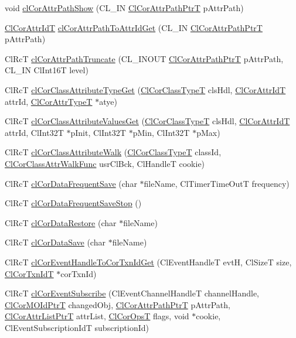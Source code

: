 \begin{CompactItemize}
\item 
void \hyperlink{group__group13_ga137}{cl\-Cor\-Attr\-Path\-Show} (CL\_\-IN \hyperlink{struct_cl_cor_attr_path}{Cl\-Cor\-Attr\-Path\-Ptr\-T} p\-Attr\-Path)
\item 
\hyperlink{group__group13_ga3}{Cl\-Cor\-Attr\-Id\-T} \hyperlink{group__group13_ga138}{cl\-Cor\-Attr\-Path\-To\-Attr\-Id\-Get} (CL\_\-IN \hyperlink{struct_cl_cor_attr_path}{Cl\-Cor\-Attr\-Path\-Ptr\-T} p\-Attr\-Path)
\item 
Cl\-Rc\-T \hyperlink{group__group13_ga133}{cl\-Cor\-Attr\-Path\-Truncate} (CL\_\-INOUT \hyperlink{struct_cl_cor_attr_path}{Cl\-Cor\-Attr\-Path\-Ptr\-T} p\-Attr\-Path, CL\_\-IN Cl\-Int16T level)
\item 
Cl\-Rc\-T \hyperlink{group__group13_ga93}{cl\-Cor\-Class\-Attribute\-Type\-Get} (\hyperlink{group__group13_ga2}{Cl\-Cor\-Class\-Type\-T} cls\-Hdl, \hyperlink{group__group13_ga3}{Cl\-Cor\-Attr\-Id\-T} attr\-Id, \hyperlink{group__group13_ga10}{Cl\-Cor\-Attr\-Type\-T} $\ast$atye)
\item 
Cl\-Rc\-T \hyperlink{group__group13_ga94}{cl\-Cor\-Class\-Attribute\-Values\-Get} (\hyperlink{group__group13_ga2}{Cl\-Cor\-Class\-Type\-T} cls\-Hdl, \hyperlink{group__group13_ga3}{Cl\-Cor\-Attr\-Id\-T} attr\-Id, Cl\-Int32T $\ast$p\-Init, Cl\-Int32T $\ast$p\-Min, Cl\-Int32T $\ast$p\-Max)
\item 
Cl\-Rc\-T \hyperlink{group__group13_ga92}{cl\-Cor\-Class\-Attribute\-Walk} (\hyperlink{group__group13_ga2}{Cl\-Cor\-Class\-Type\-T} class\-Id, \hyperlink{group__group13_ga14}{Cl\-Cor\-Class\-Attr\-Walk\-Func} usr\-Cl\-Bck, Cl\-Handle\-T cookie)
\item 
Cl\-Rc\-T \hyperlink{group__group13_ga90}{cl\-Cor\-Data\-Frequent\-Save} (char $\ast$file\-Name, Cl\-Timer\-Time\-Out\-T frequency)
\item 
Cl\-Rc\-T \hyperlink{group__group13_ga91}{cl\-Cor\-Data\-Frequent\-Save\-Stop} ()
\item 
Cl\-Rc\-T \hyperlink{group__group13_ga88}{cl\-Cor\-Data\-Restore} (char $\ast$file\-Name)
\item 
Cl\-Rc\-T \hyperlink{group__group13_ga89}{cl\-Cor\-Data\-Save} (char $\ast$file\-Name)
\item 
Cl\-Rc\-T \hyperlink{group__group13_ga65}{cl\-Cor\-Event\-Handle\-To\-Cor\-Txn\-Id\-Get} (Cl\-Event\-Handle\-T evt\-H, Cl\-Size\-T size, \hyperlink{group__group13_ga17}{Cl\-Cor\-Txn\-Id\-T} $\ast$cor\-Txn\-Id)
\item 
Cl\-Rc\-T \hyperlink{group__group13_ga63}{cl\-Cor\-Event\-Subscribe} (Cl\-Event\-Channel\-Handle\-T channel\-Handle, \hyperlink{struct_cl_cor_m_o_id}{Cl\-Cor\-MOId\-Ptr\-T} changed\-Obj, \hyperlink{struct_cl_cor_attr_path}{Cl\-Cor\-Attr\-Path\-Ptr\-T} p\-Attr\-Path, \hyperlink{struct_cl_cor_attr_list}{Cl\-Cor\-Attr\-List\-Ptr\-T} attr\-List, \hyperlink{group__group13_ga333}{Cl\-Cor\-Ops\-T} flags, void $\ast$cookie, Cl\-Event\-Subscription\-Id\-T subscription\-Id)

\end{CompactItemize}
